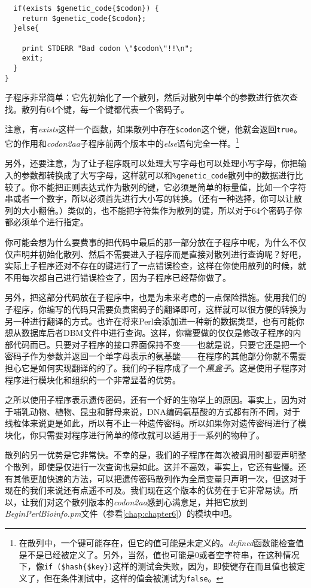 \begin{lstlisting}
  if(exists $genetic_code{$codon}) {
    return $genetic_code{$codon};
  }else{

    print STDERR "Bad codon \"$codon\"!!\n";
    exit;
  }
}
\end{lstlisting}

子程序非常简单：它先初始化了一个散列，然后对散列中单个的参数进行依次查找。散列有64个键，每一个键都代表一个密码子。

注意，有\textit{exists}这样一个函数，如果散列中存在\verb|$codon|这个键，他就会返回\verb|true|。它的作用和\textit{codon2aa}子程序前两个版本中的\textit{else}语句完全一样。\footnote{在散列中，一个键可能存在，但它的值可能是未定义的。\textit{defined}函数能检查值是不是已经被定义了。另外，当然，值也可能是0或者空字符串，在这种情况下，像\verb|if ($hash{$key})|这样的测试会失败，因为，即使键存在而且值也被定义了，但在条件测试中，这样的值会被测试为\verb|false|。}

另外，还要注意，为了让子程序既可以处理大写字母也可以处理小写字母，你把输入的参数都转换成了大写字母，这样就可以和\verb|%genetic_code|散列中的数据进行比较了。你不能把正则表达式作为散列的键，它必须是简单的标量值，比如一个字符串或者一个数字，所以必须首先进行大小写的转换。（还有一种选择，你可以让散列的大小翻倍。）类似的，也不能把字符集作为散列的键，所以对于64个密码子你都必须单个进行指定。

你可能会想为什么要费事的把代码中最后的那一部分放在子程序中呢，为什么不仅仅声明并初始化散列、然后不需要进入子程序而是直接对散列进行查询呢？好吧，实际上子程序还对不存在的键进行了一点错误检查，这样在你使用散列的时候，就不用每次都自己进行错误检查了，因为子程序已经帮你做了。

另外，把这部分代码放在子程序中，也是为未来考虑的一点保险措施。使用我们的子程序，你编写的代码只需要负责密码子的翻译即可，这样就可以很方便的转换为另一种进行翻译的方式。也许在将来Perl会添加进一种新的数据类型，也有可能你想从数据库后者DBM文件中进行查询。这样，你需要做的仅仅是修改子程序的内部代码而已。只要对子程序的接口界面保持不变——也就是说，只要它还是把一个密码子作为参数并返回一个单字母表示的氨基酸——在程序的其他部分你就不需要担心它是如何实现翻译的的了。我们的子程序成了一个\textit{黑盒子}。这是使用子程序对程序进行模块化和组织的一个非常显著的优势。

之所以使用子程序表示遗传密码，还有一个好的生物学上的原因。事实上，因为对于哺乳动物、植物、昆虫和酵母来说，DNA编码氨基酸的方式都有所不同，对于线粒体来说更是如此，所以有不止一种遗传密码。所以如果你对遗传密码进行了模块化，你只需要对程序进行简单的修改就可以适用于一系列的物种了。

散列的另一优势是它非常快。不幸的是，我们的子程序在每次被调用时都要声明整个散列，即使是仅进行一次查询也是如此。这并不高效，事实上，它还有些慢。还有其他更加快速的方法，可以把遗传密码散列作为全局变量只声明一次，但这对于现在的我们来说还有点遥不可及。我们现在这个版本的优势在于它非常易读。所以，让我们对这个散列版本的\textit{codon2aa}感到心满意足，并把它放到\textit{BeginPerlBioinfo.pm}文件（参看\autoref{chap:chapter6}）的模块中吧。

